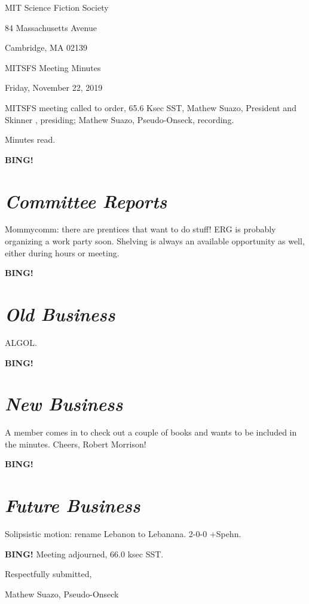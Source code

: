 \documentclass[10pt]{article}
\newcommand{\bing}{{\bf BING!} }
\newcommand{\goto}[1]{\bing \vskip 12pt \section*{{\em{#1}}}}
\newcommand{\skinner}{Mathew Suazo, President and Skinner }
\newcommand{\onseck}{Mathew Suazo, Pseudo-Onseck}
\newcommand{\meetingdate}{Friday, November 22, 2019 }
\begin{document}
\begin{center}

MIT Science Fiction Society

84 Massachusetts Avenue

Cambridge, MA 02139

\vspace{12pt}

MITSFS Meeting Minutes

\meetingdate

\end{center}

\vspace{18pt}

\setlength{\parskip}{6pt}

\noindent
MITSFS meeting called to order, 65.6 Ksec SST,
\skinner, presiding; \onseck, recording.

Minutes read.

\goto{Committee Reports}

Mommycomm: there are prentices that want to do stuff! ERG is probably organizing a work party soon. Shelving is always an available opportunity as well, either during hours or meeting.

\goto{Old Business}

ALGOL.

\goto{New Business}

A member comes in to check out a couple of books and wants to be included in the minutes. Cheers, Robert Morrison!

\goto{Future Business}

Solipsistic motion: rename Lebanon to Lebanana. 2-0-0 +Spehn.

\bing
\noindent
Meeting adjourned, 66.0 ksec SST.

\vspace{18pt}

\centerline{Respectfully submitted,}
\centerline{\onseck}
\end{document}
